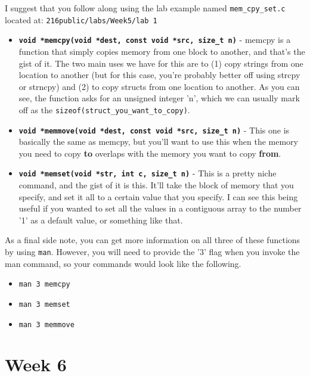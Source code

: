 \documentclass[english, 10pt]{article}
\begin{document}
I suggest that you follow along using the lab example named \texttt{mem\_cpy\_set.c} located at: \newline \texttt{216public/labs/Week5/lab 1}

\begin{itemize}
	\item \textbf{\texttt{void *memcpy(void *dest, const void *src, size\_t n)}} - memcpy is a function that simply copies memory from one block to another, and that's the gist of it. The two main uses we have for this are to (1) copy strings from one location to another (but for this case, you're probably better off using strcpy or strncpy) and (2) to copy structs from one location to another. As you can see, the function asks for an unsigned integer 'n', which we can usually mark off as the \texttt{sizeof(struct\_you\_want\_to\_copy)}.
	\item \textbf{\texttt{void *memmove(void *dest, const void *src, size\_t n)}} - This one is basically the same as memcpy, but you'll want to use this when the memory you need to copy \textbf{to} overlaps with the memory you want to copy \textbf{from}.
	\item \textbf{\texttt{void *memset(void *str, int c, size\_t n)}} - This is a pretty niche command, and the gist of it is this. It'll take the block of memory that you specify, and set it all to a certain value that you specify. I can see this being useful if you wanted to set all the values in a contiguous array to the number '1' as a default value, or something like that.\newline

\end{itemize}

As a final side note, you can get more information on all three of these functions by using \texttt{man}. However, you will need to provide the '3' flag when you invoke the man command, so your commands would look like the following.

\begin{itemize}
	\item \texttt{man 3 memcpy}
	\item \texttt{man 3 memset}
	\item \texttt{man 3 memmove}
\end{itemize}

\section{Week 6}
\end{document}
